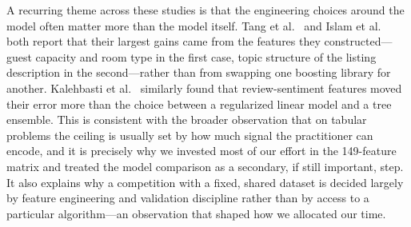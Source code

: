 \documentclass[journal]{IEEEtran}
\begin{document}
A recurring theme across these studies is that the engineering choices around the
model often matter more than the model itself. Tang et al.\ \cite{tang2024} and
Islam et al.\ \cite{islam2022} both report that their largest gains came from the
features they constructed---guest capacity and room type in the first case, topic
structure of the listing description in the second---rather than from swapping one
boosting library for another. Kalehbasti et al.\ \cite{kalehbasti2019} similarly
found that review-sentiment features moved their error more than the choice
between a regularized linear model and a tree ensemble. This is consistent with
the broader observation that on tabular problems the ceiling is usually set by how
much signal the practitioner can encode, and it is precisely why we invested most
of our effort in the 149-feature matrix and treated the model comparison as a
secondary, if still important, step. It also explains why a competition with a
fixed, shared dataset is decided largely by feature engineering and validation
discipline rather than by access to a particular algorithm---an observation that
shaped how we allocated our time.
\end{document}
